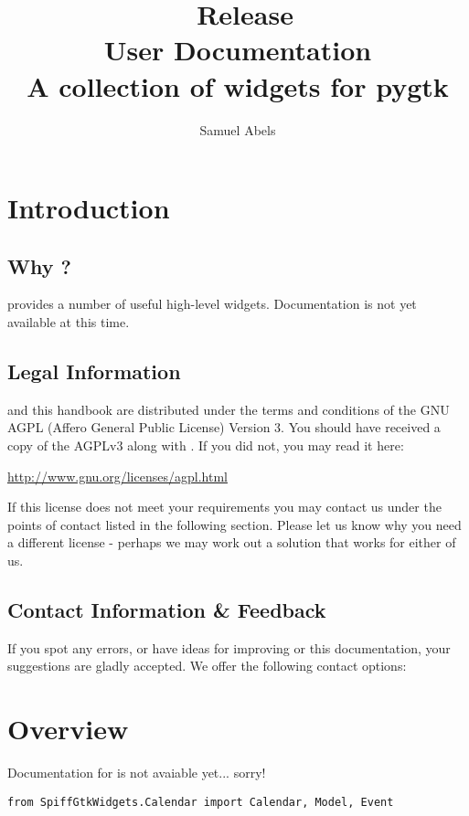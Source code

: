 \title{\productname\ Release \productversion\\
User Documentation\\
\vspace{5 mm}
\large A collection of widgets for pygtk}
\author{Samuel Abels}


\maketitle
\tableofcontents

\newpage
\section{Introduction}
\subsection{Why \productname?}

\product provides a number of useful high-level widgets.
Documentation is not yet available at this time.


\subsection{Legal Information}

\product and this handbook are distributed under the terms and conditions 
of the GNU AGPL (Affero General Public License) Version 3. You should have
received  a copy of the AGPLv3 along with \product. If you did not, you may
read it here:

\vspace{1em}
\url{http://www.gnu.org/licenses/agpl.html}
\vspace{1em}

If this license does not meet your requirements you may contact us under 
the points of contact listed in the following section. Please let us know 
why you need a different license - perhaps we may work out a solution 
that works for either of us.


\subsection{Contact Information \& Feedback}

If you spot any errors, or have ideas for improving \product or this 
documentation, your suggestions are gladly accepted.
We offer the following contact options: \\



\newpage
\section{Overview}

Documentation for \product is not avaiable yet... sorry!

\begin{lstlisting}
from SpiffGtkWidgets.Calendar import Calendar, Model, Event
\end{lstlisting}


